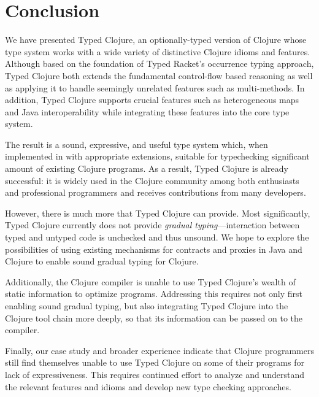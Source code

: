 \section{Conclusion}
\label{sec:conclusion}

We have presented Typed Clojure, an optionally-typed version of
Clojure whose type system works with a wide variety of distinctive
Clojure idioms and features. Although based on the foundation of Typed
Racket's occurrence typing approach, Typed Clojure both extends the
fundamental control-flow based reasoning as well as applying it to
handle seemingly unrelated features such as multi-methods. In
addition, Typed Clojure supports crucial features such as heterogeneous
maps and Java interoperability while integrating these features into
the core type system.

The result is a sound, expressive, and useful type system which, when
implemented in \coretyped with appropriate extensions, suitable for
typechecking significant amount of existing Clojure programs.
%
As a result, Typed Clojure is already successful: it is widely used in
the Clojure community among both enthusiasts and professional
programmers and receives contributions from many developers.


However, there is much more that Typed Clojure can provide. Most
significantly, Typed Clojure currently does not provide \emph{gradual
  typing}---interaction between typed and untyped code is unchecked and
thus unsound. We hope to explore the possibilities of using existing
mechanisms for contracts and proxies in Java and
Clojure to enable sound gradual typing for Clojure.

Additionally, the Clojure compiler is unable to use Typed Clojure's
wealth of static information to optimize programs. Addressing this
requires not only first enabling sound gradual typing, but also
integrating Typed Clojure into the Clojure tool chain more deeply, so
that its information can be passed on to the compiler. 

Finally, our case study and broader experience indicate that Clojure
programmers still find themselves unable to use Typed Clojure on some
of their programs for lack of expressiveness. This requires continued
effort to analyze and understand the relevant features and idioms and
develop new type checking approaches.
